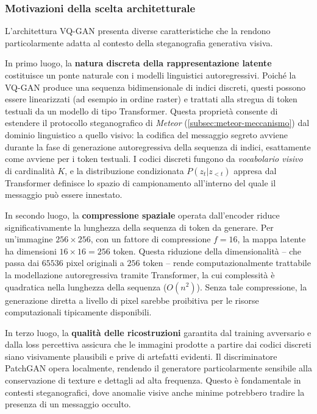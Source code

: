 \subsubsection{Motivazioni della scelta architetturale}
L'architettura VQ-GAN presenta diverse caratteristiche che la rendono particolarmente adatta al contesto della steganografia generativa visiva.

In primo luogo, la \textbf{natura discreta della rappresentazione latente} costituisce un ponte naturale con i modelli linguistici autoregressivi. Poiché la VQ-GAN produce una sequenza bidimensionale di indici discreti, questi possono essere linearizzati (ad esempio in ordine raster) e trattati alla stregua di token testuali da un modello di tipo Transformer. Questa proprietà consente di estendere il protocollo steganografico di \emph{Meteor} (\autoref{subsec:meteor-meccanismo}) dal dominio linguistico a quello visivo: la codifica del messaggio segreto avviene durante la fase di generazione autoregressiva della sequenza di indici, esattamente come avviene per i token testuali. I codici discreti fungono da \emph{vocabolario visivo} di cardinalità $K$, e la distribuzione condizionata $P(z_t | z_{<t})$ appresa dal Transformer definisce lo spazio di campionamento all'interno del quale il messaggio può essere innestato.

In secondo luogo, la \textbf{compressione spaziale} operata dall'encoder riduce significativamente la lunghezza della sequenza di token da generare. Per un'immagine $256 \times 256$, con un fattore di compressione $f = 16$, la mappa latente ha dimensioni $16 \times 16 = 256$ token. Questa riduzione della dimensionalità -- che passa dai $65536$ pixel originali a $256$ token -- rende computazionalmente trattabile la modellazione autoregressiva tramite Transformer, la cui complessità è quadratica nella lunghezza della sequenza ($O(n^2)$). Senza tale compressione, la generazione diretta a livello di pixel sarebbe proibitiva per le risorse computazionali tipicamente disponibili.

In terzo luogo, la \textbf{qualità delle ricostruzioni} garantita dal training avversario e dalla loss percettiva assicura che le immagini prodotte a partire dai codici discreti siano visivamente plausibili e prive di artefatti evidenti. Il discriminatore PatchGAN opera localmente, rendendo il generatore particolarmente sensibile alla conservazione di texture e dettagli ad alta frequenza. Questo è fondamentale in contesti steganografici, dove anomalie visive anche minime potrebbero tradire la presenza di un messaggio occulto.

